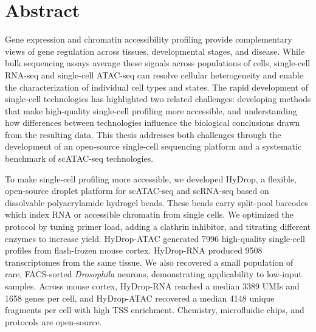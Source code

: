 \chapter*{Abstract}
Gene expression and chromatin accessibility profiling provide complementary views of gene regulation across tissues, developmental stages, and disease. While bulk sequencing assays average these signals across populations of cells, single-cell RNA-seq and single-cell ATAC-seq can resolve cellular heterogeneity and enable the characterization of individual cell types and states. The rapid development of single-cell technologies has highlighted two related challenges: developing methods that make high-quality single-cell profiling more accessible, and understanding how differences between technologies influence the biological conclusions drawn from the resulting data. This thesis addresses both challenges through the development of an open-source single-cell sequencing platform and a systematic benchmark of scATAC-seq technologies.

To make single-cell profiling more accessible, we developed HyDrop, a flexible, open-source droplet platform for scATAC-seq and scRNA-seq based on dissolvable polyacrylamide hydrogel beads. These beads carry split-pool barcodes which index RNA or accessible chromatin from single cells. We optimized the protocol by tuning primer load, adding a clathrin inhibitor, and titrating different enzymes to increase yield. HyDrop-ATAC generated \num{7996} high-quality single-cell profiles from flash-frozen mouse cortex. HyDrop-RNA produced \num{9508} transcriptomes from the same tissue. We also recovered a small population of rare, FACS-sorted \textit{Drosophila} neurons, demonstrating applicability to low-input samples. Across mouse cortex, HyDrop-RNA reached a median \num{3389} UMIs and \num{1658} genes per cell, and HyDrop-ATAC recovered a median \num{4148} unique fragments per cell with high TSS enrichment. Chemistry, microfluidic chips, and protocols are open-source.

